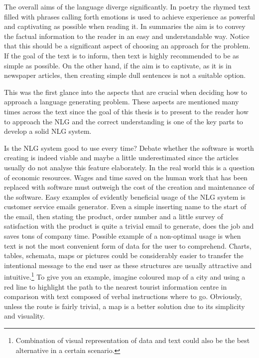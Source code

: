 The overall aims of the language diverge significantly. In poetry the rhymed text filled with phrases calling forth emotions is used to achieve experience as powerful and captivating as possible when reading it. In summaries the aim is to convey the factual information to the reader in an easy and understandable way. Notice that this should be a significant aspect of choosing an approach for the problem. If the goal of the text is to inform, then text is highly recommended to be as simple as possible. On the other hand, if the aim is to captivate, as it is in newspaper articles, then creating simple dull sentences is not a suitable option. 

This was the first glance into the aspects that are crucial when deciding how to approach a language generating problem. These aspects are mentioned many times across the text since the goal of this thesis is to present to the reader how to approach the NLG and the correct understanding is one of the key parts to develop a solid NLG system.

Is the NLG system good to use every time? Debate whether the software is worth creating is indeed viable and maybe a little underestimated since the articles usually do not analyse this feature elaborately. In the real world this is a question of economic resources. Wages and time saved on the human work that has been replaced with software must outweigh the cost of the creation and maintenance of the software. Easy examples of evidently beneficial usage of the NLG system is customer service emails generator. Even a simple inserting name to the start of the email, then stating the product, order number and a little survey of satisfaction with the product is quite a trivial email to generate, does the job and saves tons of company time. Possible example of a non-optimal usage is when text is not the most convenient form of data for the user to comprehend. Charts, tables, schemata, maps or pictures could be considerably easier to transfer the intentional message to the end user as these structures are usually attractive and intuitive.\footnote{Combination of visual representation of data and text could also be the best alternative in a certain scenario.} To give you an example, imagine coloured map of a city and using a red line to highlight the path to the nearest tourist information centre in comparison with text composed of verbal instructions where to go. Obviously, unless the route is fairly trivial, a map is a better solution due to its simplicity and visuality. 

